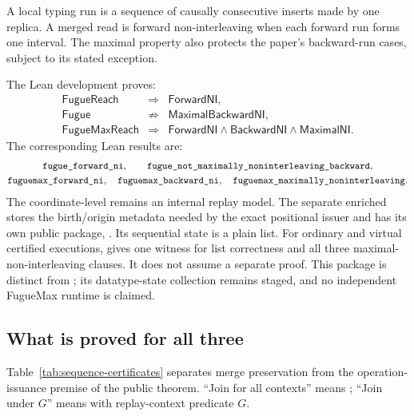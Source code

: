 \begin{definition}
A local typing run is a sequence of causally consecutive inserts made by one
replica. A merged read is forward non-interleaving when each forward run forms
one interval. The maximal property also protects the paper's backward-run
cases, subject to its stated exception.
\end{definition}

The Lean development proves:
\[
\begin{array}{rcl}
\mathsf{FugueReach} &\Longrightarrow& \mathsf{ForwardNI},\\
\mathsf{Fugue} &\not\Longrightarrow& \mathsf{MaximalBackwardNI},\\
\mathsf{FugueMaxReach} &\Longrightarrow&
  \mathsf{ForwardNI}\land\mathsf{BackwardNI}\land\mathsf{MaximalNI}.
\end{array}
\]
The corresponding Lean results are:
\[
\begin{gathered}
\texttt{fugue\_forward\_ni},\qquad
\texttt{fugue\_not\_maximally\_noninterleaving\_backward},\\
\texttt{fuguemax\_forward\_ni},\quad
\texttt{fuguemax\_backward\_ni},\quad
\texttt{fuguemax\_maximally\_noninterleaving}.
\end{gathered}
\]
The coordinate-level  remains an internal replay model. The
separate enriched  stores the birth/origin metadata
needed by the exact positional issuer and has its own public package,
. Its sequential state is a plain list. For ordinary
and virtual certified executions,  gives one witness
for list correctness and all three maximal-non-interleaving clauses. It does
not assume a separate  proof. This package is distinct from
; its datatype-state collection remains
staged, and no independent FugueMax runtime is claimed.

\subsection{What is proved for all three}
\label{sec:proved-all}

Table~\ref{tab:sequence-certificates} separates merge preservation from the
operation-issuance premise of the public theorem. ``Join for all contexts''
means ; ``Join under $G$'' means  with replay-context
predicate $G$.

